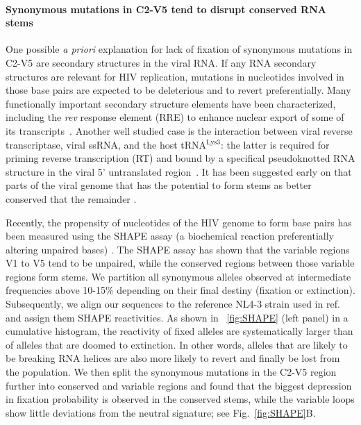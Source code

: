 \documentclass[rmp, twocolumn]{revtex4}
\newcommand{\rev}{\textit{rev}}
\newcommand{\FIG}[1]{Fig.~\ref{fig:#1}}
\begin{document}
\paragraph{Synonymous mutations in C2-V5 tend to disrupt conserved RNA stems}
One possible {\it a priori} explanation for lack of fixation of synonymous mutations in C2-V5 are  secondary structures in the viral RNA. If any RNA secondary structures are relevant for HIV replication,
mutations in nucleotides involved in those base pairs are expected  to be deleterious and to revert preferentially. 
Many functionally important secondary structure elements have been characterized, including  the  \rev{} response element (RRE) to enhance nuclear export of some of its transcripts~\citep{fernandes_hiv-1_2012}. Another well studied case is the interaction between viral reverse transcriptase, viral ssRNA, and the host tRNA$^\text{Lys3}$: the latter is required for priming reverse transcription (RT) and bound by a specifical pseudoknotted RNA structure in the viral 5' untranslated region~\citep{barat_interaction_1991, paillart_vitro_2002}. It has been suggested early on that parts of the viral genome that has the potential to form stems as better conserved that the remainder \citep{forsdyke_reciprocal_1995}.

Recently, the propensity of nucleotides of the HIV genome to form base pairs has been measured using the SHAPE assay (a biochemical reaction preferentially altering unpaired bases) \citep{watts_architecture_2009}. The SHAPE assay has shown that the variable regions V1 to V5 tend to be unpaired, while the conserved regions between those variable regions form stems. We partition all synonymous alleles observed
at intermediate frequencies above 10-15\% depending on their final destiny
(fixation or extinction). Subsequently, we align our sequences to the reference
NL4-3 strain used in ref.~\citep{watts_architecture_2009} and assign them SHAPE
reactivities. As shown in \figurename~\ref{fig:SHAPE} (left panel) in a
cumulative histogram, the reactivity of fixed alleles are systematically larger
than of alleles that are doomed to extinction. In other words, alleles that are
likely to be breaking RNA helices are also more likely to revert and finally be
lost from the population. We then split the synonymous mutations in the C2-V5 region further into conserved and variable regions and found that the biggest depression in fixation probability is observed in the conserved stems, while the variable loops show little deviations from the neutral signature; see \FIG{SHAPE}B. 
\end{document}
